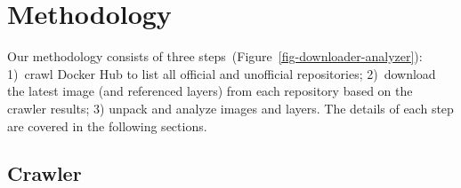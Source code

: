 \section{Methodology}
\label{sec:methodology}



Our methodology consists of three steps~(Figure~\ref{fig-downloader-analyzer}):
1)~crawl Docker Hub to list all official and unofficial repositories;
2)~download the latest image (and referenced layers) from each repository based
on the crawler results; 3) unpack and analyze images and layers.
%
%
%
%
The details of each step are covered in the following sections.
%
%
%
%




%
\subsection{Crawler}
\label{sec:crawler}

